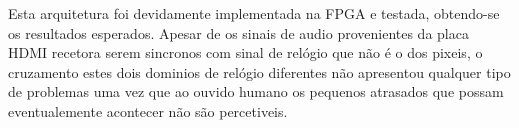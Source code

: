
Esta arquitetura foi devidamente implementada na FPGA e testada, obtendo-se os resultados esperados. Apesar de os sinais de audio provenientes da placa HDMI recetora serem sincronos com sinal de relógio que não é o dos pixeis, o cruzamento estes dois dominios de relógio diferentes não apresentou qualquer tipo de problemas uma vez que ao ouvido humano os pequenos atrasados que possam eventualemente acontecer não são percetiveis. 